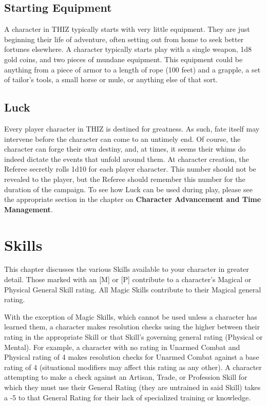 \documentclass[oneside]{book}
\begin{document}
\section{Starting Equipment}
A character in THIZ typically starts with very little equipment. They are just beginning their life of adventure, often setting out from home to seek better fortunes elsewhere. A character typically starts play with a single weapon, 1d8 gold coins, and two pieces of mundane equipment. This equipment could be anything from a piece of armor to a length of rope (100 feet) and a grapple, a set of tailor's tools, a small horse or mule, or anything else of that sort. 

\section{Luck}
Every player character in THIZ is destined for greatness. As such, fate itself may intervene before the character can come to an untimely end. Of course, the character can forge their own destiny, and, at times, it seems their whims do indeed dictate the events that unfold around them.  At character creation, the Referee secretly rolls 1d10 for each player character. This number should not be revealed to the player, but the Referee should remember this number for the duration of the campaign. To see how Luck can be used during play, please see the appropriate section in the chapter on \textbf{Character Advancement and Time Management}.

\chapter{Skills}
This chapter discusses the various Skills available to your character in greater detail. Those marked with an [M] or [P] contribute to a character's Magical or Physical General Skill rating. All Magic Skills contribute to their Magical general rating.

With the exception of Magic Skills, which cannot be used unless a character has learned them, a character makes resolution checks using the higher between their rating in the appropriate Skill or that Skill's governing general rating (Physical or Mental). For example, a character with no rating in Unarmed Combat and Physical rating of 4 makes resolution checks for Unarmed Combat against a base rating of 4 (situational modifiers may affect this rating as any other). A character attempting to make a check against an Artisan, Trade, or Profession Skill for which they must use their General Rating (they are untrained in said Skill) takes a -5 to that General Rating for their lack of specialized training or knowledge.
\end{document}
